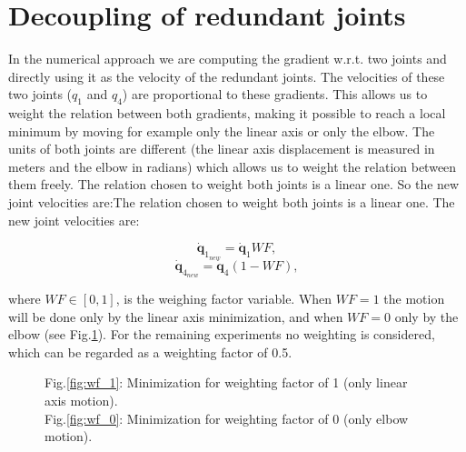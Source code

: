 \section{Decoupling of redundant joints}
\label{sec:Decoupling}
\label{subsubsec:weighting}




In the numerical approach we are computing the gradient w.r.t. two joints and directly using it as the velocity of the redundant joints. The velocities of these two joints ($q_1$ and $q_4$) are proportional to these gradients. This allows us to weight the relation between both gradients, making it possible to reach a local minimum
by moving for example only the linear axis or only the elbow. The units of both joints are different (the linear axis displacement is measured in meters and the elbow in radians) which allows us to weight the relation between them freely.
The relation chosen to weight both joints is a linear one. So the new joint velocities are:The relation chosen to weight both joints is a linear one. The new joint velocities are:

\begin{equation}
	\mathbf{\dot{q}}_{1_{new}}  = \mathbf{\dot{q}}_{1}WF,
	\label{eq:decoupling_q1} 
\end{equation} 
\begin{equation}
	\mathbf{\dot{q}}_{4_{new}} = \mathbf{\dot{q}}_{4}(1-WF),
	\label{eq:decoupling_q4}
\end{equation}


where $WF \in [0,1]$, is the weighing factor variable.
When $WF=1$ the motion will be done only by the linear axis minimization, and when $WF=0$ only by the elbow (see Fig.\ref{fig:wf}).
For the  remaining experiments no weighting is considered, which can be regarded as a weighting factor of 0.5.

\begin{figure}[!h]
	\centering	
	 	 	 	
	\caption{Fig.\ref{fig:wf_1}: Minimization for weighting factor of 1 (only  linear axis motion). \\ Fig.\ref{fig:wf_0}: Minimization for weighting factor of 0 (only elbow motion). }
	\label{fig:wf}
\end{figure}

